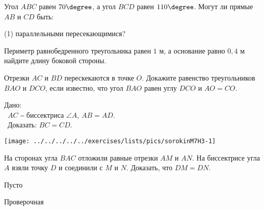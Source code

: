 \begin{homework}[number=3]
	\begin{listofex}
		\item  Угол \( ABC\) равен \( 70\degree \), а угол \( BCD \) равен \( 110\degree \). Могут ли прямые \( AB \) и \( CD \) быть:
		\begin{tasks}(1)
			\task[a)] параллельными
			\task[б)] пересекающимися?
		\end{tasks}
		\item Периметр равнобедренного треугольника равен \( 1 \) м, а основание равно \( 0,4 \) м найдите длину боковой стороны.
		\item Отрезки \( AC \) и \( BD \) перескекаются в точке \( O \). Докажите равенство треугольников \( BAO \) и \( DCO \), если известно, что угол \( BAO \) равен углу \( DCO \) и \( AO=CO \).
		\item 
		\begin{minipage}[t]{\bodywidth}
			Дано: \\\ \( AC \) ‒ биссектриса \( \angle A \), \( AB=AD \).\\\ Доказать: \( BC = CD \).
		\end{minipage}
		\hspace{0.02\linewidth}
		\begin{minipage}[t]{\picwidth}
			\texttt{[image: ../../../../../exercises/lists/pics/sorokinM7H3-1]}
		\end{minipage}
		\item На сторонах угла \( BAC \) отложили равные отрезки \( AM \) и \( AN \). На биссектрисе угла \( A \) взяли точку \( D \) и соединили с \( M \) и \( N \). Доказать, что \( DM=DN \).
	\end{listofex}
\end{homework}

\begin{class}[number=4]
	\begin{listofex}
		\item Пусто
	\end{listofex}
\end{class}


\begin{exam}
	\begin{listofex}
		\item Проверочная
	\end{listofex}
\end{exam}
